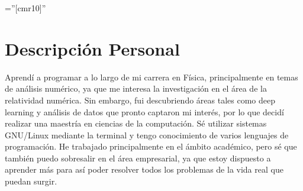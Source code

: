\documentclass[a4paper,10pt]{article} %
\begin{document}
\pagestyle{empty} %
\BgThispage
\font\fb=''[cmr10]'' %

\small

\par{\bigskip\par} %
\par{\bigskip\par}

\section{Descripción Personal}

Aprendí a programar a lo largo de mi carrera en Física, principalmente en temas de análisis numérico, ya que me interesa la investigación en el área de la relatividad numérica. Sin embargo, fui descubriendo áreas tales como deep learning y análisis de datos que pronto captaron mi interés, por lo que decidí realizar una maestría en ciencias de la computación. Sé utilizar sistemas GNU/Linux mediante la terminal y tengo conocimiento de varios lenguajes de programación. He trabajado principalmente en el ámbito académico, pero sé que también puedo sobresalir en el área empresarial, ya que estoy dispuesto a aprender más para así poder resolver todos los problemas de la vida real que puedan surgir.
\end{document}
